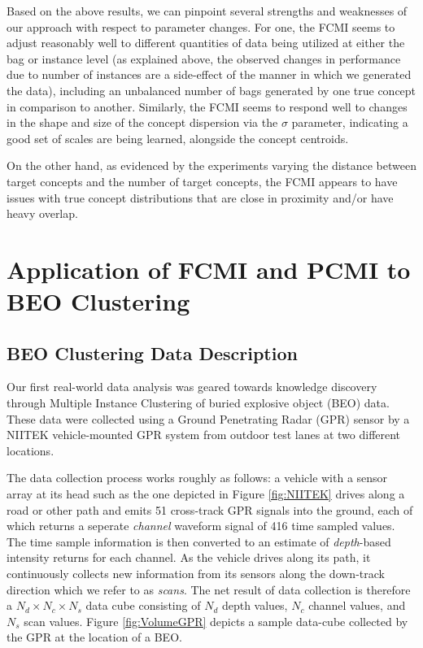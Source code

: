 \documentclass[12pt,dvips]{report}
\numberwithin{equation}{section}
\begin{document}
Based on the above results, we can pinpoint several strengths and weaknesses of our approach with respect to parameter changes.  For one, the FCMI seems to adjust reasonably well to different quantities of data being utilized at either the bag or instance level (as explained above, the observed changes in performance due to number of instances are a side-effect of the manner in which we generated the data), including an unbalanced number of bags generated by one true concept in comparison to another.  Similarly, the FCMI seems to respond well to changes in the shape and size of the concept dispersion via the $\sigma$ parameter, indicating a good set of scales are being learned, alongside the concept centroids.

On the other hand, as evidenced by the experiments varying the distance between target concepts and the number of target concepts, the FCMI appears to have issues with true concept distributions that are close in proximity and/or have heavy overlap.

\clearpage

\section{Application of FCMI and PCMI to BEO Clustering} \label{sec:BEOClustering}

\subsection{BEO Clustering Data Description} \label{subsec:BEOClusteringData}

Our first real-world data analysis was geared towards knowledge discovery through Multiple Instance Clustering of buried explosive object (BEO) data.  These data were collected using a Ground Penetrating Radar (GPR) sensor by a NIITEK vehicle-mounted GPR system \cite{NIITEK} from outdoor test lanes at two different locations.

The data collection process works roughly as follows: a vehicle with a sensor array at its head such as the one depicted in Figure \ref{fig:NIITEK} drives along a road or other path and emits 51 cross-track GPR signals into the ground, each of which returns a seperate \emph{channel} waveform signal of 416 time sampled values.  The time sample information is then converted to an estimate of \emph{depth}-based intensity returns for each channel.  As the vehicle drives along its path, it continuously collects new information from its sensors along the down-track direction which we refer to as \emph{scans}.  The net result of  data collection is therefore a $N_{d} \times N_{c} \times N_{s}$ data cube consisting of $N_{d}$ depth values, $N_{c}$ channel values, and $N_{s}$ scan values.  Figure \ref{fig:VolumeGPR} depicts a sample data-cube collected by the GPR  at the location of a BEO.
\end{document}
